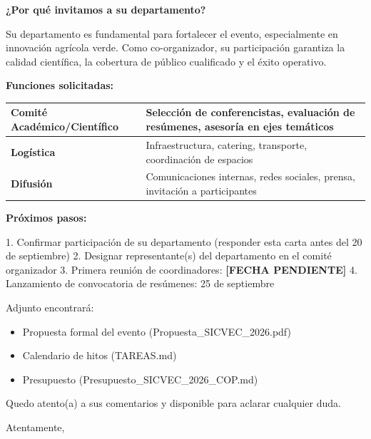 \documentclass[12pt,a4paper]{article}
\begin{document}
\vspace{0.8cm}

\textbf{¿Por qué invitamos a su departamento?}

Su departamento es fundamental para fortalecer el evento, especialmente en innovación agrícola verde. Como co-organizador, su participación garantiza la calidad científica, la cobertura de público cualificado y el éxito operativo.

\vspace{1cm}

\textbf{Funciones solicitadas:}

\begin{tabular}{|l|p{10cm}|}
\hline
\textbf{Comité Académico/Científico} & Selección de conferencistas, evaluación de resúmenes, asesoría en ejes temáticos \\
\hline
\textbf{Logística} & Infraestructura, catering, transporte, coordinación de espacios \\
\hline
\textbf{Difusión} & Comunicaciones internas, redes sociales, prensa, invitación a participantes \\
\hline
\end{tabular}

\vspace{1cm}

\textbf{Próximos pasos:}

1. Confirmar participación de su departamento (responder esta carta antes del 20 de septiembre)
2. Designar representante(s) del departamento en el comité organizador
3. Primera reunión de coordinadores: \textbf{[FECHA PENDIENTE]}
4. Lanzamiento de convocatoria de resúmenes: 25 de septiembre

\vspace{1cm}

Adjunto encontrará:
\begin{itemize}
  \item Propuesta formal del evento (Propuesta\_SICVEC\_2026.pdf)
  \item Calendario de hitos (TAREAS.md)
  \item Presupuesto (Presupuesto\_SICVEC\_2026\_COP.md)
\end{itemize}

\vspace{1cm}

Quedo atento(a) a sus comentarios y disponible para aclarar cualquier duda.

\vspace{1.5cm}

Atentamente,
\end{document}
